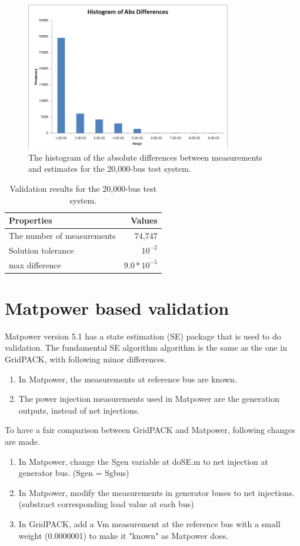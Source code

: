 \documentclass[a4paper]{article}
\begin{document}
\begin{figure}[ht]
\centering
\includegraphics[width=0.8\textwidth]{20000.png}
\caption{The histogram of the absolute differences between measurements and estimates for the 20,000-bus test system.}
\label{fig:20000}
\end{figure}

\begin{table} [h]
\centering
\begin{tabular}{l|r}
Properties & Values \\\hline
The number of measurements & 74,747 \\
Solution tolerance	& $10^{-2}$ \\
max difference	&  $9.0*10^{-5}$ 
\end{tabular}
\caption{\label{tab:20000} Validation results for  the 20,000-bus test system.}
\end{table}

\section{Matpower based validation}

Matpower version 5.1 has a state estimation (SE) package that is used to do validation. The fundamental SE algorithm algorithm is the same as the one in GridPACK, with following minor differences.

\begin{enumerate}
  \item In Matpower, the measurements at reference bus are known. 
  \item The power injection measurements used in Matpower are the generation outputs, instead of net injections.
\end{enumerate}
To have a fair comparison between GridPACK and Matpower, following changes are made.
\begin{enumerate}
  \item In Matpower, change the Sgen variable at doSE.m to net injection at generator bus. (Sgen = Sgbus) 
  \item In Matpower, modify the measurements in generator buses to net injections. (substract corresponding load value at each bus)
  \item In GridPACK, add a Vm measurement at the reference bus with a small weight (0.0000001) to make it "known" as Matpower does.
\end{enumerate}
\end{document}
